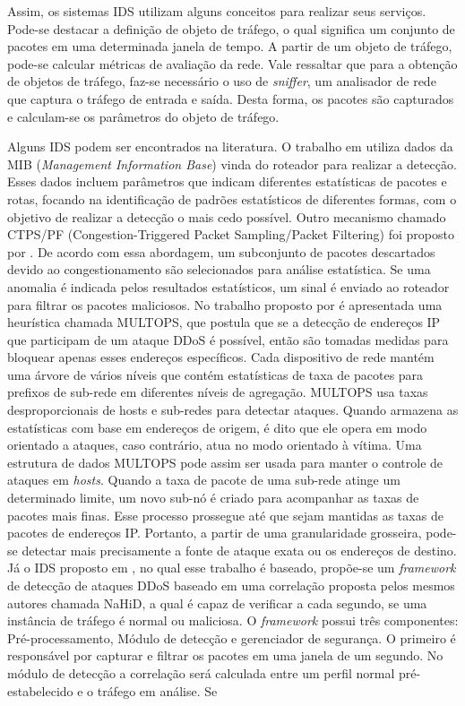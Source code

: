 Assim, os sistemas IDS utilizam alguns conceitos para realizar seus serviços. Pode-se destacar a definição de objeto de tráfego, o qual significa um conjunto de pacotes em uma determinada janela de tempo. A partir de um objeto de tráfego, pode-se calcular métricas de avaliação da rede. Vale ressaltar que para a obtenção de objetos de tráfego, faz-se necessário o uso de \textit{sniffer}, um analisador de rede que captura o tráfego de entrada e saída. Desta forma, os pacotes são capturados e calculam-se os parâmetros do objeto de tráfego.

Alguns IDS podem ser encontrados na literatura. O trabalho em \cite{cabrera2001proactive} utiliza dados da MIB (\textit{Management Information Base}) vinda do roteador para realizar a detecção. Esses dados incluem parâmetros que indicam diferentes estatísticas de pacotes e rotas, focando na identificação de padrões estatísticos de diferentes formas, com o objetivo de realizar a detecção o mais cedo possível. Outro mecanismo chamado CTPS/PF (Congestion-Triggered Packet Sampling/Packet Filtering) foi proposto por \cite{huang2001countering}. De acordo com essa abordagem, um subconjunto de pacotes descartados devido ao congestionamento são selecionados para análise estatística. Se uma anomalia é indicada pelos resultados estatísticos, um sinal é enviado ao roteador para filtrar os pacotes maliciosos. No trabalho proposto por  é apresentada uma heurística chamada MULTOPS, que postula que se a detecção de endereços IP que participam de um ataque DDoS é possível, então são tomadas medidas para bloquear apenas esses endereços específicos. Cada dispositivo de rede mantém uma árvore de vários níveis que contém estatísticas de taxa de pacotes para prefixos de sub-rede em diferentes níveis de agregação. MULTOPS usa taxas desproporcionais de hosts e sub-redes para detectar ataques. Quando armazena as estatísticas com base em endereços de origem, é dito que ele opera em modo orientado a ataques, caso contrário, atua no modo orientado à vítima. Uma estrutura de dados MULTOPS pode assim ser usada para manter o controle de ataques em \textit{hosts}. Quando a taxa de pacote de uma sub-rede atinge um determinado limite, um novo sub-nó é criado para acompanhar as taxas de pacotes mais finas. Esse processo prossegue até que sejam mantidas as taxas de pacotes de endereços IP. Portanto, a partir de uma granularidade grosseira, pode-se detectar mais precisamente a fonte de ataque exata ou os endereços de destino. Já o IDS proposto em , no qual esse trabalho é baseado,  propõe-se um \textit{framework} de detecção de ataques DDoS baseado em uma correlação proposta pelos mesmos autores chamada NaHiD, a qual é capaz de verificar a cada segundo, se uma instância de tráfego é normal ou maliciosa. O \textit{framework} possui três componentes: Pré-processamento, Módulo de detecção e gerenciador de segurança. O primeiro é responsável por capturar e filtrar os pacotes em uma janela de um segundo. No módulo de detecção a correlação será calculada entre um perfil normal pré-estabelecido e o tráfego  em análise. Se 
